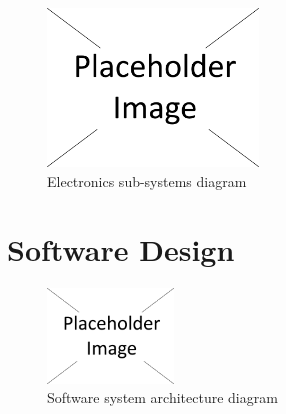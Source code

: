\documentclass{report}
\begin{document}
		\begin{figure}[H]
			\begin{center}
				\includegraphics[width=0.5\textwidth]{placeholder}
			\end{center}
			\vspace{-15pt}
			\caption{Electronics sub-systems diagram}
		\end{figure}


	\section{Software Design}

		\begin{figure}
			\vspace{-30pt}
	 		\begin{center}
			\includegraphics[width=0.30\textwidth]{placeholder}
			\end{center}
			\vspace{-15pt}
			\caption[X]{Software system architecture diagram}
		\end{figure}
\end{document}
